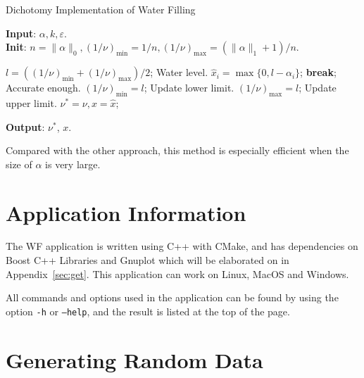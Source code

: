\documentclass[journal,twoside]{IEEEtran}
\begin{document}
    \begin{algorithm}[htbp]
      \caption{Dichotomy Implementation of Water Filling}
      \begin{flushleft}
        \textbf{Input}: $\alpha, k, \varepsilon$.\\
        \textbf{Init}: $n=\|\alpha\|_0,(1/\nu)_{\min}=1/n,(1/\nu)_{\max}=(\|\alpha\|_1+1)/n$.
      \end{flushleft}
      \begin{algorithmic}[1]
          \State $l=((1/\nu)_{\min}+(1/\nu)_{\max})/2$;
          \Comment Water level.
            \State $\hat{x}_i=\max\{0,l-\alpha_i\}$;
          \EndFor
            \State \textbf{break};
            \Comment Accurate enough.
          \Else
              \State $(1/\nu)_{\min}=l$;
              \Comment Update lower limit.
            \Else
              \State $(1/\nu)_{\max}=l$;
              \Comment Update upper limit.
            \EndIf
          \EndIf
          \EndFor
        \State $\nu^*=\nu,x=\hat{x}$;
      \end{algorithmic}
      \begin{flushleft}
        \textbf{Output}: $\nu^*$, $x$.
      \end{flushleft}
      \label{alg}
  \end{algorithm}
  Compared with the other approach,
  this method is especially efficient when the size of $\alpha$ is very large.
  
  \section{Application Information}\label{sec:info}

    The WF application is written using C++ with CMake, and has dependencies on Boost C++ Libraries and Gnuplot which will be elaborated on in Appendix~\ref{sec:get}.
    This application can work on Linux, MacOS and Windows.

    All commands and options used in the application can be found by using the option \texttt{-h} or \texttt{---help}, and the result is listed at the top of the page.    

  \section{Generating Random Data}\label{sec:gen}
\end{document}
